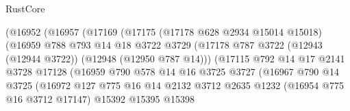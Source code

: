 \begin{lexlean}{RustCore}
\begin{coremodule}
                                  (@16952
                                    (@16957
                                      (@17169
                                        (@17175
                                          (@17178 @628 @2934 @15014 @15018)
                                          (@16959
                                            @788
                                            @793
                                            @14
                                            @18
                                            @3722
                                            @3729
                                            (@17178
                                              @787
                                              @3722
                                              (@12943 (@12944 @3722))
                                              (@12948 (@12950 @787 @14)))
                                            (@17115
                                              @792
                                              @14
                                              @17
                                              @2141
                                              @3728
                                              @17128
                                              (@16959
                                                @790
                                                @578
                                                @14
                                                @16
                                                @3725
                                                @3727
                                                (@16967
                                                  @790
                                                  @14
                                                  @3725
                                                  (@16972
                                                    @127
                                                    @775
                                                    @16
                                                    @14
                                                    @2132
                                                    @3712
                                                    @2635
                                                    @1232
                                                    (@16954 @775 @16 @3712 @17147)
                                                    @15392
                                                    @15395
                                                    @15398

\end{coremodule}
\end{lexlean}
